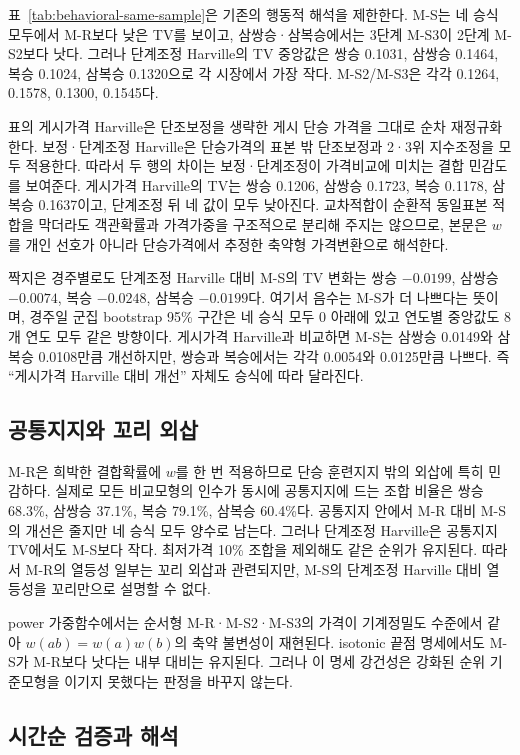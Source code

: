 표~\ref{tab:behavioral-same-sample}은 기존의 행동적 해석을 제한한다. M-S는 네
승식 모두에서 M-R보다 낮은 TV를 보이고, 삼쌍승·삼복승에서는 3단계 M-S3이
2단계 M-S2보다 낫다. 그러나 단계조정 Harville의 TV 중앙값은 쌍승 0.1031,
삼쌍승 0.1464, 복승 0.1024, 삼복승 0.1320으로 각 시장에서 가장 작다.
M-S2/M-S3은 각각 0.1264, 0.1578, 0.1300, 0.1545다.

표의 게시가격 Harville은 단조보정을 생략한 게시 단승 가격을 그대로 순차
재정규화한다. 보정·단계조정 Harville은 단승가격의 표본 밖 단조보정과 2·3위
지수조정을 모두 적용한다. 따라서 두 행의 차이는 보정·단계조정이 가격비교에
미치는 결합 민감도를 보여준다. 게시가격 Harville의 TV는 쌍승 0.1206, 삼쌍승
0.1723, 복승 0.1178, 삼복승 0.1637이고, 단계조정 뒤 네 값이 모두 낮아진다.
교차적합이 순환적 동일표본 적합을 막더라도 객관확률과 가격가중을 구조적으로
분리해 주지는 않으므로, 본문은 $w$를 개인 선호가 아니라 단승가격에서 추정한
축약형 가격변환으로 해석한다.

짝지은 경주별로도 단계조정 Harville 대비 M-S의 TV 변화는 쌍승 $-0.0199$,
삼쌍승 $-0.0074$, 복승 $-0.0248$, 삼복승 $-0.0199$다. 여기서 음수는 M-S가
더 나쁘다는 뜻이며, 경주일 군집 bootstrap 95\% 구간은 네 승식 모두 0 아래에
있고 연도별 중앙값도 8개 연도 모두 같은 방향이다. 게시가격 Harville과 비교하면
M-S는 삼쌍승 0.0149와 삼복승 0.0108만큼 개선하지만, 쌍승과 복승에서는 각각
0.0054와 0.0125만큼 나쁘다. 즉 ``게시가격 Harville 대비 개선'' 자체도 승식에
따라 달라진다.

\subsection{공통지지와 꼬리 외삽}

M-R은 희박한 결합확률에 $w$를 한 번 적용하므로 단승 훈련지지 밖의 외삽에
특히 민감하다. 실제로 모든 비교모형의 인수가 동시에 공통지지에 드는 조합
비율은 쌍승 68.3\%, 삼쌍승 37.1\%, 복승 79.1\%, 삼복승 60.4\%다.
공통지지 안에서 M-R 대비 M-S의 개선은 줄지만 네 승식 모두 양수로 남는다.
그러나 단계조정 Harville은 공통지지 TV에서도 M-S보다 작다. 최저가격 10\%
조합을 제외해도 같은 순위가 유지된다. 따라서 M-R의 열등성 일부는 꼬리
외삽과 관련되지만, M-S의 단계조정 Harville 대비 열등성을 꼬리만으로 설명할
수 없다.

power 가중함수에서는 순서형 M-R·M-S2·M-S3의 가격이 기계정밀도 수준에서
같아 $w(ab)=w(a)w(b)$의 축약 불변성이 재현된다. isotonic 끝점 명세에서도
M-S가 M-R보다 낫다는 내부 대비는 유지된다. 그러나 이 명세 강건성은 강화된
순위 기준모형을 이기지 못했다는 판정을 바꾸지 않는다.

\subsection{시간순 검증과 해석}


